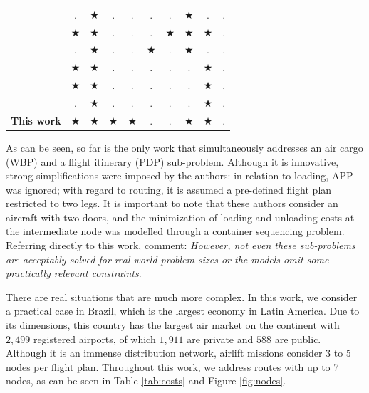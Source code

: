 \documentclass[preprint,authoryear]{elsarticle}
\begin{document}
\begin{table}[H]
\begin{tabular}{r|cc|cc|cc|ccc}
		\cite{RoesenerBarnes2016}  & $.$ & $\bigstar$   & $.$ & $.$ & $.$ & $.$   & $\bigstar$  & $.$  &  $.$ \\
		\cite{PaquaySchynsLimbourg2016,PaquayLimbourgSchynsOliveira2018}  & $\bigstar$ & $\bigstar$ & $.$ & $.$ & $.$ & $\bigstar$ & $\bigstar$  & $\bigstar$ & $.$ \\
		\cite{YangLiuGao2018} & $.$ & $\bigstar$  & $.$  & $.$ & $\bigstar$  & $.$ & $\bigstar$ & $.$  & $.$ \\
		\cite{wong2020} & $\bigstar$  & $\bigstar$  & $.$  & $.$   & $.$  & $.$ & $.$ & $\bigstar$  & $.$  \\
		\cite{eugene2021} & $\bigstar$ & $\bigstar$ & $.$  & $.$   & $.$ & $.$ & $.$ & $\bigstar$  & $.$  \\
		\cite{zhao2021} & $.$ & $\bigstar$ & $.$  & $.$  & $.$ & $.$ & $.$  & $\bigstar$ &  $.$ \\
		{\bf This work}   & $\bigstar$ & $\bigstar$  & $\bigstar$& $\bigstar$ & $.$ & $.$ & $\bigstar$ & $\bigstar$   &  $.$  \\
		\bottomrule 
	\end{tabular}
	\normalsize 
\end{table}

As can be seen, so far \cite{LurkinSchyns2015} is the only work that simultaneously addresses an air cargo (WBP) and a flight itinerary (PDP) sub-problem. Although it is innovative, strong simplifications were imposed by the authors: in relation to loading, APP was ignored; with regard to routing, it is assumed a pre-defined flight plan restricted to two legs. It is important to note that these authors consider an aircraft with two doors, and the minimization of loading and unloading costs at the intermediate node was modelled through a container sequencing problem. Referring directly to this work, \cite[p. 409]{BrandtStefan2019} comment: {\it However, not even these sub-problems are acceptably solved for real-world problem sizes or the models omit some practically relevant constraints}. 

There are real situations that are much more complex. In this work, we consider a practical case in Brazil, which is the largest economy in Latin America. Due to its dimensions, this country has the largest air market on the continent with $2,499$\/ registered airports, of which $1,911$\/ are private and $588$\/ are public. Although it is an immense distribution network, airlift missions consider 3 to 5 nodes per flight plan. Throughout this work, we address routes with up to 7 nodes, as can be seen in Table \ref{tab:costs} and Figure \ref{fig:nodes}.
\end{document}
